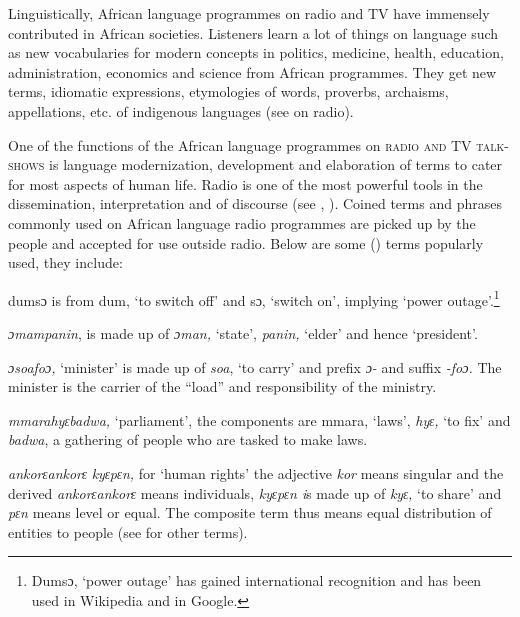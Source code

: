 \documentclass[output=paper,
modfonts
]{langscibook}
\begin{document}
Linguistically, African language programmes on radio and TV have immensely contributed  in African societies. Listeners learn a lot of things on language such as new vocabularies for modern concepts in politics, medicine, health, education, administration, economics and science from African programmes. They get new terms, idiomatic expressions, etymologies of words, proverbs, archaisms, appellations, etc. of indigenous languages (see \citealt{Agyekum2010radio} on radio). 

One of the  functions of the African language programmes on \textsc{radio and TV talk-shows} is language modernization, development and elaboration of terms to cater for most aspects of human life. Radio is one of the most powerful tools in the dissemination, interpretation and  of discourse (see \citealt{Agyekum2000}, \citeyear{Agyekum2010radio}). Coined terms and phrases commonly used on African language radio programmes are picked up by the people and accepted for use outside radio. Below are some  () terms popularly used, they include: 

\ea\label{ex:agyekum:1}
{dumsɔ is from dum, ‘to switch off’ and sɔ, ‘switch on’, implying ‘power outage’.\footnote{Dumsɔ, ‘power outage’ has gained international recognition and has been used in Wikipedia and in Google.}}\\
\z

\ea\label{ex:agyekum:2}
{\textit{ɔ}\textit{mampanin}, is made up of \textit{ɔman,} ‘state’, \textit{panin,} ‘elder’ and hence ‘president’. }\\
\z

\ea\label{ex:agyekum:3}
{\textit{ɔ}\textit{soafo}\textit{ɔ}\textit{,} ‘minister’ is made up of \textit{soa}, ‘to carry’ and  prefix \textit{ɔ{}- }and suffix \textit{{}-foɔ.} The minister is the carrier of the “load” and responsibility of the ministry.}\\
\z

\ea\label{ex:agyekum:4}
{\textit{mmarahy}\textsc{\textit{ɛ}}\textit{badwa,} ‘parliament’, the components are mmara, ‘laws’, \textit{hy}\textsc{\textit{ɛ}}\textit{,} ‘to fix’ and \textit{badwa}, a gathering of people who are tasked to make laws.}\\
\z

\ea\label{ex:agyekum:5}
{\textit{ankor}\textsc{\textit{ɛ}}\textit{ankor}\textsc{\textit{ɛ}}\textit{ ky}\textsc{\textit{ɛ}}\textit{p}\textsc{\textit{ɛ}}\textit{n, }for ‘human rights’ the adjective \textit{kor} means singular and the derived  \textit{ankor}\textsc{\textit{ɛ}}\textit{ankor}\textsc{\textit{ɛ}} means individuals, \textit{ky}\textsc{\textit{ɛ}}\textit{p}\textsc{\textit{ɛ}}\textit{n i}s made up of \textit{ky}\textsc{\textit{ɛ}}\textit{,} ‘to share’ and \textit{p}\textsc{\textit{ɛ}}\textit{n} means level or equal. The composite term thus means equal distribution of entities to people (see \citealt{Agyekum2006} for other terms).}\\
\z
\end{document}
